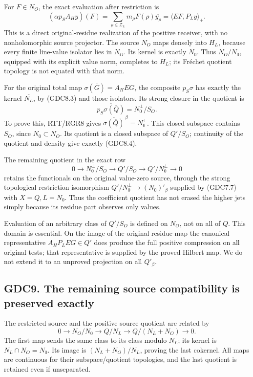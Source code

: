 For \(F\in N_O\), the exact evaluation after restriction is \[
(\alpha p_S A_Hy)(F)
=\sum_{\rho\in\mathscr Z_L}m_\rho F(\rho)\overline{y_\rho}
=\langle EF,P_Ly\rangle_+.
\tag{GDC8.3}
\] This is a direct original-residue realization of the positive
receiver, with no nonholomorphic source projector. The source \(N_O\)
maps densely into \(H_L\), because every finite line-value isolator lies
in \(N_O\). Its kernel is exactly \(N_0\). Thus \(N_O/N_0\), equipped
with its explicit value norm, completes to \(H_L\); its Fréchet quotient
topology is not equated with that norm.

For the original total map \(\sigma(\overline G)=A_HEG\), the composite
\(p_S\sigma\) has exactly the kernel \(\overline{N_L}\), by (GDC8.3) and
those isolators. Its strong closure in the quotient is \[
\boxed{\overline{p_S\sigma(\overline Q)}=N_0^\perp/S_O.}
\tag{GDC8.4}
\] To prove this, RTT/RGR8 gives
\(\overline{\sigma(\overline Q)}^{\,\beta}=N_0^\perp\). This closed
subspace contains \(S_O\), since \(N_0\subset N_O\). Its quotient is a
closed subspace of \(Q'/S_O\); continuity of the quotient and density
give exactly (GDC8.4).

The remaining quotient in the exact row \[
0\to N_0^\perp/S_O\to Q'/S_O\to Q'/N_0^\perp\to0
\tag{GDC8.5}
\] retains the functionals on the original value-zero source, through
the strong topological restriction isomorphism
\(Q'/N_0^\perp\to (N_0)'_\beta\) supplied by (GDC7.7) with
\(X=Q,L=N_0\). Thus the coefficient quotient has not erased the higher
jets simply because its residue part observes only values.

Evaluation of an arbitrary class of \(Q'/S_O\) is defined on \(N_O\),
not on all of \(Q\). This domain is essential. On the image of the
original residue map the canonical representative \(A_HP_LEG\in Q'\)
does produce the full positive compression on all original tests; that
representative is supplied by the proved Hilbert map. We do not extend
it to an unproved projection on all \(Q'_\beta\).

\subsection{GDC9. The remaining source compatibility is preserved
exactly}\label{gdc9.-the-remaining-source-compatibility-is-preserved-exactly}

The restricted source and the positive source quotient are related by \[
0\to N_O/N_0\longrightarrow Q/N_L
\longrightarrow Q/(N_L+N_O)\to0.
\tag{GDC9.1}
\] The first map sends the same class to its class modulo \(N_L\); its
kernel is \(N_L\cap N_O=N_0\). Its image is \((N_L+N_O)/N_L\), proving
the last cokernel. All maps are continuous for their subspace/quotient
topologies, and the last quotient is retained even if unseparated.

